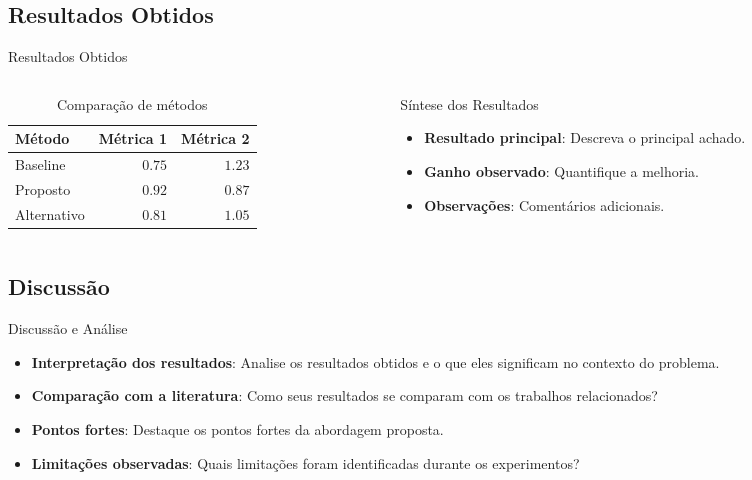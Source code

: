 \subsection{Resultados Obtidos}
\begin{frame}{Resultados Obtidos}
  \begin{columns}[t]
    \begin{column}{0.54\textwidth}
      \begin{table}
        \centering
        \small
        \begin{tabular}{lrr}
          \toprule
          \textbf{Método} & \textbf{Métrica 1} & \textbf{Métrica 2} \\
          \midrule
          Baseline      & $0.75$ & $1.23$ \\
          Proposto      & $\mathbf{0.92}$ & $\mathbf{0.87}$ \\
          Alternativo   & $0.81$ & $1.05$ \\
          \bottomrule
        \end{tabular}
        \caption{Comparação de métodos}
      \end{table}
    \end{column}
    \begin{column}{0.46\textwidth}
      \begin{block}{Síntese dos Resultados}
        \begin{itemize}
          \scriptsize
          \item \textbf{Resultado principal}: Descreva o principal achado.
          \item \textbf{Ganho observado}: Quantifique a melhoria.
          \item \textbf{Observações}: Comentários adicionais.
        \end{itemize}
      \end{block}
    \end{column}
  \end{columns}
\end{frame}

\subsection{Discussão}
\begin{frame}{Discussão e Análise}
  \begin{itemize}
    \setlength{\itemsep}{10pt}
    \item \textbf{Interpretação dos resultados}: Analise os resultados obtidos e o que eles significam no contexto do problema.
    \item \textbf{Comparação com a literatura}: Como seus resultados se comparam com os trabalhos relacionados?
    \item \textbf{Pontos fortes}: Destaque os pontos fortes da abordagem proposta.
    \item \textbf{Limitações observadas}: Quais limitações foram identificadas durante os experimentos?
  \end{itemize}
\end{frame}
